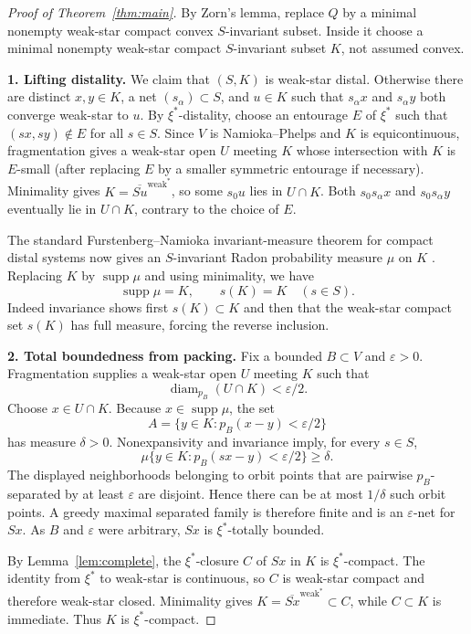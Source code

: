 \documentclass[11pt]{article}
\newcommand{\wstar}{\mathrm{weak}^*}
\newcommand{\diam}{\operatorname{diam}}
\newcommand{\supp}{\operatorname{supp}}
\begin{document}
\begin{proof}[Proof of Theorem~\ref{thm:main}]
By Zorn's lemma, replace $Q$ by a minimal nonempty weak-star compact convex
$S$-invariant subset.  Inside it choose a minimal nonempty weak-star compact
$S$-invariant subset $K$, not assumed convex.

\smallskip
\noindent\textbf{1. Lifting distality.}
We claim that $(S,K)$ is weak-star distal.  Otherwise there are distinct
$x,y\in K$, a net $(s_\alpha)\subset S$, and $u\in K$ such that
$s_\alpha x$ and $s_\alpha y$ both converge weak-star to $u$.  By
$\xi^*$-distality, choose an entourage $E$ of $\xi^*$ such that
$(sx,sy)\notin E$ for all $s\in S$.  Since $V$ is Namioka--Phelps and $K$ is
equicontinuous, fragmentation gives a weak-star open $U$ meeting $K$ whose
intersection with $K$ is $E$-small (after replacing $E$ by a smaller
symmetric entourage if necessary).  Minimality gives
$K=\overline{Su}^{\wstar}$, so some $s_0u$ lies in $U\cap K$.  Both
$s_0s_\alpha x$ and $s_0s_\alpha y$ eventually lie in $U\cap K$, contrary to
the choice of $E$.

The standard Furstenberg--Namioka invariant-measure theorem for compact distal
systems now gives an $S$-invariant Radon probability measure $\mu$ on $K$
\cite{Wisnicki2020,GM2012}.  Replacing $K$ by $\supp\mu$ and using minimality,
we have
\[
 \supp\mu=K,\qquad s(K)=K \quad(s\in S).
\]
Indeed invariance shows first $s(K)\subset K$ and then that the weak-star
compact set $s(K)$ has full measure, forcing the reverse inclusion.

\smallskip
\noindent\textbf{2. Total boundedness from packing.}
Fix a bounded $B\subset V$ and $\varepsilon>0$.  Fragmentation supplies a
weak-star open $U$ meeting $K$ such that
\[
 \diam_{p_B}(U\cap K)<\varepsilon/2.
\]
Choose $x\in U\cap K$.  Because $x\in\supp\mu$, the set
\[
 A=\{y\in K:p_B(x-y)<\varepsilon/2\}
\]
has measure $\delta>0$.  Nonexpansivity and invariance imply, for every
$s\in S$,
\[
 \mu\{y\in K:p_B(sx-y)<\varepsilon/2\}\ge\delta.
\]
The displayed neighborhoods belonging to orbit points that are pairwise
$p_B$-separated by at least $\varepsilon$ are disjoint.  Hence there can be at
most $1/\delta$ such orbit points.  A greedy maximal separated family is
therefore finite and is an $\varepsilon$-net for $Sx$.  As $B$ and
$\varepsilon$ were arbitrary, $Sx$ is $\xi^*$-totally bounded.

By Lemma~\ref{lem:complete}, the $\xi^*$-closure $C$ of $Sx$ in $K$ is
$\xi^*$-compact.  The identity from $\xi^*$ to weak-star is continuous, so
$C$ is weak-star compact and therefore weak-star closed.  Minimality gives
$K=\overline{Sx}^{\wstar}\subset C$, while $C\subset K$ is immediate.  Thus
$K$ is $\xi^*$-compact.


\end{proof}
\end{document}
